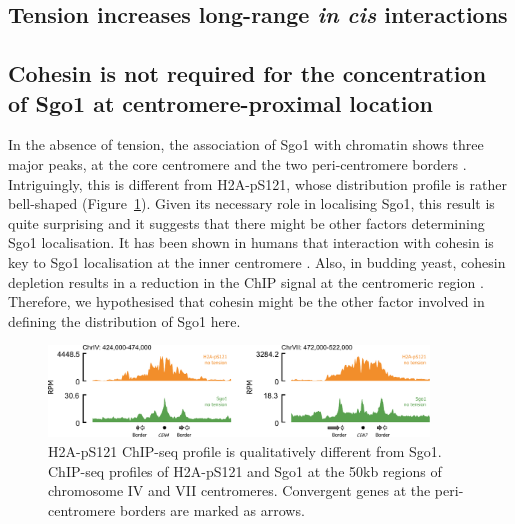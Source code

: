 \subsection{Tension increases long-range \textit{in cis} interactions}
\subsection{Cohesin is not required for the concentration of Sgo1 at centromere-proximal location}

In the absence of tension, the association of Sgo1 with chromatin shows three major peaks, at the core centromere and the two peri-centromere borders \citep{Verzijlbergen2014, Paldi2020ConvergentPericentromeres}. Intriguingly, this is different from H2A-pS121, whose distribution profile is rather bell-shaped (Figure~\ref{fig:sgo1comparison}). Given its necessary role in localising Sgo1, this result is quite surprising and it suggests that there might be other factors determining Sgo1 localisation. It has been shown in humans that interaction with cohesin is key to Sgo1 localisation at the inner centromere \citep{Liu2013a}. Also, in budding yeast, cohesin depletion results in a reduction in the ChIP signal at the centromeric region \citep{Verzijlbergen2014}. Therefore, we hypothesised that cohesin might be the other factor involved in defining the distribution of Sgo1 here. 

\begin{figure}[htbp]
  \centering
  \includegraphics[width=0.9\textwidth]{chapter3/figures/Sgo1 comparison.pdf}
  \caption[H2A-pS121 ChIP-seq profile is qualitatively different from Sgo1]{H2A-pS121 ChIP-seq profile is qualitatively different from Sgo1. ChIP-seq profiles of H2A-pS121 and Sgo1 \citep{Paldi2020ConvergentPericentromeres} at the 50kb regions of chromosome IV and VII centromeres. Convergent genes at the peri-centromere borders are marked as arrows. }
  \label{fig:sgo1comparison}
\end{figure}


